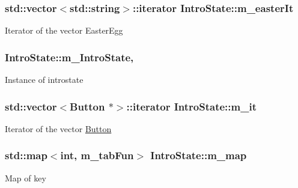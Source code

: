 \subsubsection[{m\+\_\+easter\+It}]{\setlength{\rightskip}{0pt plus 5cm}std\+::vector$<$std\+::string$>$\+::iterator Intro\+State\+::m\+\_\+easter\+It\hspace{0.3cm}{\ttfamily [private]}}\label{class_intro_state_a9a4157cf8aa4a5ce48b782b7f4a33af9}
Iterator of the vector Easter\+Egg \hypertarget{class_intro_state_a43ad1f560360ce4e465b059697193aa5}{}
\subsubsection[{m\+\_\+\+Intro\+State}]{ Intro\+State\+::m\+\_\+\+Intro\+State\hspace{0.3cm}{\ttfamily [static]}, {\ttfamily [private]}}\label{class_intro_state_a43ad1f560360ce4e465b059697193aa5}
Instance of introstate \hypertarget{class_intro_state_aff5068e91ae89f0c123dcfb3b269f5c7}{}
\subsubsection[{m\+\_\+it}]{\setlength{\rightskip}{0pt plus 5cm}std\+::vector$<${\bf Button} $\ast$$>$\+::iterator Intro\+State\+::m\+\_\+it\hspace{0.3cm}{\ttfamily [private]}}\label{class_intro_state_aff5068e91ae89f0c123dcfb3b269f5c7}
Iterator of the vector \hyperlink{class_button}{Button} \hypertarget{class_intro_state_a4c23780e73716669d319929e8906c598}{}
\subsubsection[{m\+\_\+map}]{\setlength{\rightskip}{0pt plus 5cm}std\+::map$<$int, m\+\_\+tab\+Fun$>$ Intro\+State\+::m\+\_\+map\hspace{0.3cm}{\ttfamily [private]}}\label{class_intro_state_a4c23780e73716669d319929e8906c598}
Map of key \hypertarget{class_intro_state_a746908a39dc856517869254b7d0a4114}{}
